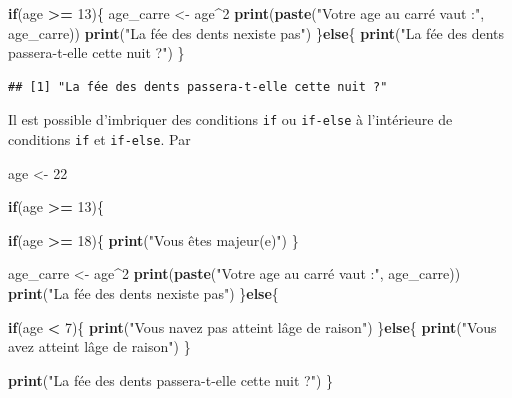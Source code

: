 \documentclass[
  11pt,
]{book}
\newenvironment{Shaded}{\begin{snugshade}}{\end{snugshade}}
\newcommand{\ControlFlowTok}[1]{\textcolor[rgb]{0.13,0.29,0.53}{\textbf{#1}}}
\newcommand{\DecValTok}[1]{\textcolor[rgb]{0.00,0.00,0.81}{#1}}
\newcommand{\FunctionTok}[1]{\textcolor[rgb]{0.13,0.29,0.53}{\textbf{#1}}}
\newcommand{\NormalTok}[1]{#1}
\newcommand{\OtherTok}[1]{\textcolor[rgb]{0.56,0.35,0.01}{#1}}
\newcommand{\SpecialCharTok}[1]{\textcolor[rgb]{0.81,0.36,0.00}{\textbf{#1}}}
\newcommand{\StringTok}[1]{\textcolor[rgb]{0.31,0.60,0.02}{#1}}
\numberwithin{equation}{section}
\numberwithin{countremarque}{section}
\begin{document}
\begin{Shaded}
\begin{Highlighting}[]
\ControlFlowTok{if}\NormalTok{(age }\SpecialCharTok{\textgreater{}=} \DecValTok{13}\NormalTok{)\{}
\NormalTok{  age\_carre }\OtherTok{\textless{}{-}}\NormalTok{ age}\SpecialCharTok{\^{}}\DecValTok{2}
  \FunctionTok{print}\NormalTok{(}\FunctionTok{paste}\NormalTok{(}\StringTok{"Votre age au carré vaut :"}\NormalTok{, age\_carre))}
  \FunctionTok{print}\NormalTok{(}\StringTok{"La fée des dents n\textquotesingle{}existe pas"}\NormalTok{)}
\NormalTok{\}}\ControlFlowTok{else}\NormalTok{\{}
  \FunctionTok{print}\NormalTok{(}\StringTok{"La fée des dents passera{-}t{-}elle cette nuit ?"}\NormalTok{)}
\NormalTok{\}}
\end{Highlighting}
\end{Shaded}

\begin{lstlisting}
## [1] "La fée des dents passera-t-elle cette nuit ?"
\end{lstlisting}

Il est possible d'imbriquer des conditions \texttt{if} ou \texttt{if-else} à l'intérieure de conditions \texttt{if} et \texttt{if-else}. Par

\begin{Shaded}
\begin{Highlighting}[]
\NormalTok{age }\OtherTok{\textless{}{-}} \DecValTok{22}

\ControlFlowTok{if}\NormalTok{(age }\SpecialCharTok{\textgreater{}=} \DecValTok{13}\NormalTok{)\{}
  
  \ControlFlowTok{if}\NormalTok{(age }\SpecialCharTok{\textgreater{}=} \DecValTok{18}\NormalTok{)\{}
    \FunctionTok{print}\NormalTok{(}\StringTok{"Vous êtes majeur(e)"}\NormalTok{)}
\NormalTok{  \}}
  
\NormalTok{  age\_carre }\OtherTok{\textless{}{-}}\NormalTok{ age}\SpecialCharTok{\^{}}\DecValTok{2}
  \FunctionTok{print}\NormalTok{(}\FunctionTok{paste}\NormalTok{(}\StringTok{"Votre age au carré vaut :"}\NormalTok{, age\_carre))}
  \FunctionTok{print}\NormalTok{(}\StringTok{"La fée des dents n\textquotesingle{}existe pas"}\NormalTok{)}
\NormalTok{\}}\ControlFlowTok{else}\NormalTok{\{}
  
  \ControlFlowTok{if}\NormalTok{(age }\SpecialCharTok{\textless{}} \DecValTok{7}\NormalTok{)\{}
    \FunctionTok{print}\NormalTok{(}\StringTok{"Vous n\textquotesingle{}avez pas atteint l\textquotesingle{}âge de raison"}\NormalTok{)}
\NormalTok{  \}}\ControlFlowTok{else}\NormalTok{\{}
    \FunctionTok{print}\NormalTok{(}\StringTok{"Vous avez atteint l\textquotesingle{}âge de raison"}\NormalTok{)}
\NormalTok{  \}}
  
  \FunctionTok{print}\NormalTok{(}\StringTok{"La fée des dents passera{-}t{-}elle cette nuit ?"}\NormalTok{)}
\NormalTok{\}}
\end{Highlighting}
\end{Shaded}
\end{document}
